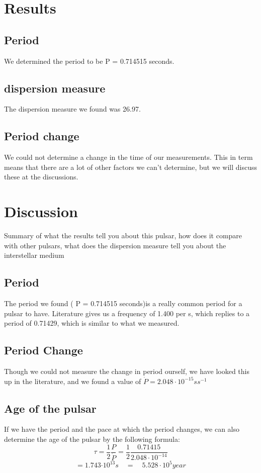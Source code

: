 \documentclass[twoside,twocolumn]{article}
\begin{document}
	
	

	\section{Results}
	\subsection{Period}
	We determined the period to be P = 0.714515 seconds.
	\subsection{dispersion measure}
	The dispersion measure we found was 26.97.
	
	\subsection{Period change}
	We could not determine a change in the time of our measurements. This in term means that there are a lot of other factors we can't determine, but we will discuss these at the discussions.
	
	
	\section{Discussion}
	Summary of what the results tell you about this pulsar, how does it compare with other
	pulsars, what does the dispersion measure tell you about the interstellar medium
	\subsection{Period}
	The period we found ( P = 0.714515 seconds)is a really common period for a pulsar to have. \cite{Wielebinski} Literature gives us a frequency of 1.400 per s, which replies to a period of 0.71429, which is similar to what we measured. \cite{Hobbs} 
	
	\subsection{Period Change}
	Though we could not measure the change in period ourself, we have looked this up in the literature, and we found a value of $\dot{P} = 2.048 \cdot {10}^{-15} s  {s}^{-1}$	\cite{Hobbs}
	
	\subsection{Age of the pulsar}
	If we have the period and the pace at which the period changes, we can also determine the age of the pulsar by the following formula: \cite{Ryan}
		\begin{equation}
	\tau =\frac { 1 }{ 2 } \frac { P }{ \dot { P }  } =\frac { 1 }{ 2 } \frac { 0.71415 }{ 2.048\cdot { 10 }^{ -14 } } 
		\end{equation}
		\begin{equation}
		=1.743{ \cdot 10 }^{ 13 }s\quad =\quad 5.528\cdot { 10 }^{ 5 } year
		\end{equation}
	
\end{document}
